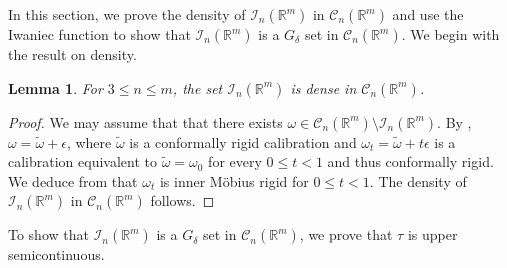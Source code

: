 \documentclass[a4paper,leqno,11pt]{amsart}
\numberwithin{equation}{section}
\newtheorem{lemma}[theorem]{Lemma}
\theoremstyle{remark}
\theoremstyle{remark}
\newcommand{\R}{\mathbb{R}}
\newcommand{\cC}{\mathcal{C}}
\begin{document}
In this section, we prove the density of $\mathcal{I}_n(\R^m)$ in $\cC_n(\R^m)$ and use the Iwaniec function to show that $\mathcal{I}_n(\R^m)$ is a $G_\delta$ set in $\cC_n(\R^m)$. We begin with the result on density.



\begin{lemma}
\label{lemma:confrigid:supremum-fail}
For $3 \leq n \leq m$, the set $\mathcal{I}_n( \R^m )$ is dense in $\mathcal{C}_n( \R^m )$.
\end{lemma}

\begin{proof}
We may assume that that there exists $\omega \in \mathcal{C}_n( \R^m ) \setminus \mathcal{I}_n( \R^m )$. By , $\omega = \widetilde{\omega} + \epsilon$, where $\widetilde{\omega}$ is a conformally rigid calibration and $\omega_t = \widetilde{\omega} + t\epsilon$ is a calibration equivalent to $\widetilde{\omega} = \omega_0$ for every $0 \leq t < 1$ and thus conformally rigid. We deduce from  that $\omega_t$ is inner Möbius rigid for $0 \leq t < 1$. The density of $\mathcal{I}_n( \R^m )$ in $\mathcal{C}_n( \R^m )$ follows.
\end{proof}

To show that $\mathcal{I}_n(\R^m)$ is a $G_\delta$ set in $\cC_n(\R^m)$, we prove that $\tau$ is upper semicontinuous.
\end{document}
